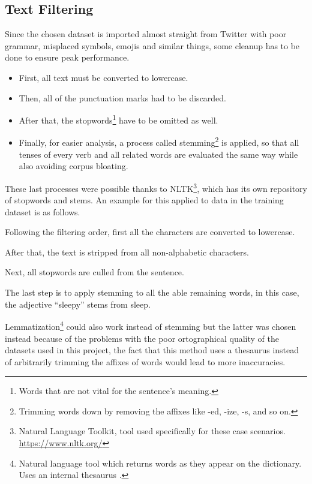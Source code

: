 \subsection{Text Filtering}
\label{txtfilter}
Since the chosen dataset is imported almost straight from Twitter with poor grammar, misplaced symbols, emojis and similar things, some cleanup has to be done to ensure peak performance.
\begin{itemize}
\item First, all text must be converted to lowercase.
\item Then, all of the punctuation marks had to be discarded.
\item After that, the stopwords\footnote{Words that are not vital for the sentence's meaning.} have to be omitted as well.
\item Finally, for easier analysis, a process called stemming\footnote{Trimming words down by removing the affixes like -ed, -ize, -s, and so on.} is applied, so that all tenses of every verb and all related words are evaluated the same way while also avoiding corpus bloating.
\end{itemize} 
These last processes were possible thanks to NLTK\footnote{Natural Language Toolkit, tool used specifically for these case scenarios. \url{https://www.nltk.org/}}, which has its own repository of stopwords and stems.
An example for this applied to data in the training dataset is as follows.
\begin{center}
\end{center}
Following the filtering order, first all the characters are converted to lowercase.
\begin{center}
\end{center}
After that, the text is stripped from all non-alphabetic characters.
\begin{center}
\end{center}
Next, all stopwords are culled from the sentence.
\begin{center}
\end{center}
The last step is to apply stemming to all the able remaining words, in this case, the adjective ``sleepy'' stems from sleep.
\begin{center}
\end{center}
Lemmatization\footnote{Natural language tool which returns words as they appear on the dictionary. Uses an internal thesaurus \citep{rf23}.} could also work instead of stemming but the latter was chosen instead because of the problems with the poor ortographical quality of the datasets used in this project, the fact that this method uses a thesaurus instead of arbitrarily trimming the affixes of words would lead to more inaccuracies.

